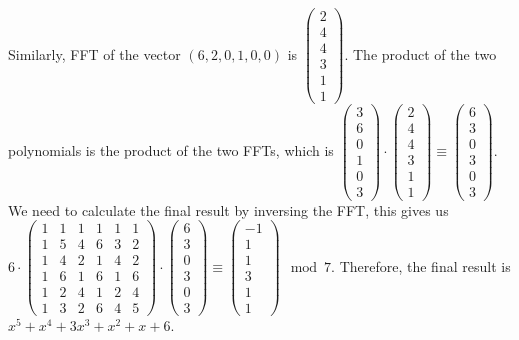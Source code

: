 \documentclass[10pt]{article}
\begin{document}
\begin{solution}
\begin{enumerate}[(a)]
        Similarly, FFT of the vector $(6, 2, 0, 1, 0, 0)$ is $\begin{pmatrix}2 \\ 4 \\ 4 \\ 3 \\ 1 \\ 1\end{pmatrix}$. The product of the two polynomials is the product of the two FFTs, 
        which is $\begin{pmatrix}3 \\ 6 \\ 0 \\ 1 \\ 0 \\ 3\end{pmatrix} \cdot \begin{pmatrix}2 \\ 4 \\ 4 \\ 3 \\ 1 \\ 1\end{pmatrix} \equiv \begin{pmatrix}6 \\3 \\ 0 \\ 3 \\ 0 \\ 3\end{pmatrix}$. 
        We need to calculate the final result by inversing the FFT, this gives us 
        $6 \cdot \begin{pmatrix}
            1 & 1 & 1 & 1 & 1 & 1 \\
            1 & 5 & 4 & 6 & 3 & 2 \\
            1 & 4 & 2 & 1 & 4 & 2 \\
            1 & 6 & 1 & 6 & 1 & 6 \\
            1 & 2 & 4 & 1 & 2 & 4 \\
            1 & 3 & 2 & 6 & 4 & 5
        \end{pmatrix} \cdot \begin{pmatrix}6 \\3 \\ 0 \\ 3 \\ 0 \\ 3\end{pmatrix} \equiv \begin{pmatrix}-1 \\1 \\ 1 \\ 3 \\ 1 \\ 1\end{pmatrix} \mod 7$. Therefore, the final result is $x^5 + x^4 + 3x^3 + x^2 + x + 6$.
    \end{enumerate}

\end{solution}
\end{document}
